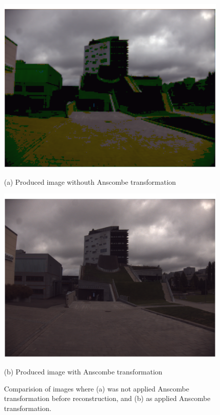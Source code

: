 \documentclass[12pt,a4paper,english
]{tunithesis}
\begin{document}
\begin{figure}[h]
  \centering
  \begin{minipage}[b]{0.45\textwidth}
    \includegraphics[width=\textwidth]{img/non-transformed-dct.png}
    \caption*{(a) Produced image withouth Anscombe transformation}
  \end{minipage}
  \hfill
  \begin{minipage}[b]{0.45\textwidth}
    \includegraphics[width=\textwidth]{img/transformed-dct.png}
    \caption*{(b) Produced image with Anscombe transformation}
  \end{minipage}
  \caption{Comparision of images where (a) was not applied Anscombe transformation before reconstruction, and (b) as applied Anscombe transformation.}
  \label{fig:comparison-dct}
\end{figure}
\end{document}
